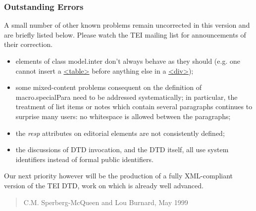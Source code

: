 \subsubsection[{Outstanding Errors}]{Outstanding Errors}\label{ppf-err}\par
A small number of other known problems remain uncorrected in this version and are briefly listed below. Please watch the TEI mailing list for announcements of their correction.\begin{itemize}
\item elements of class \textsf{model.inter} don't always behave as they should (e.g. one cannot insert a \hyperref[TEI.table]{<table>} before anything else in a \hyperref[TEI.div]{<div>});
\item some mixed-content problems consequent on the definition of \textsf{macro.specialPara} need to be addressed systematically; in particular, the treatment of list items or notes which contain several paragraphs continues to surprise many users: no whitespace is allowed between the paragraphs;
\item the {\itshape resp} attributes on editorial elements are not consistently defined;
\item the discussions of DTD invocation, and the DTD itself, all use system identifiers instead of formal public identifiers.
\end{itemize} \par
Our next priority however will be the production of a fully XML-compliant version of the TEI DTD, work on which is already well advanced.

\begin{quote}
C.M. Sperberg-McQueen and Lou Burnard, May 1999\end{quote}

